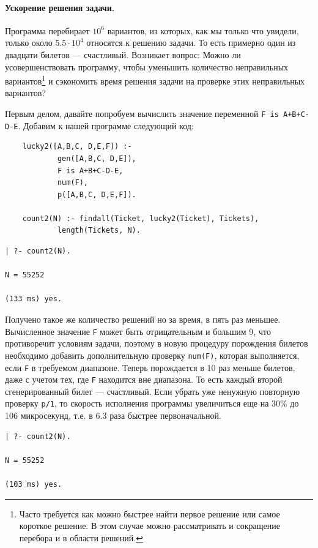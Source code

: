 \documentclass[12pt, openany, oneside]{book} %
\begin{document}
\paragraph{Ускорение решения задачи.} Программа перебирает $10^6$ вариантов, из которых, как мы только что увидели, только около $5.5\cdot 10^4$ относятся к решению задачи. То есть примерно один из двадцати билетов --- счастливый. Возникает вопрос: Можно ли усовершенствовать программу, чтобы уменьшить количество неправильных вариантов\footnote{Часто требуется как можно быстрее найти первое решение или самое короткое решение. В этом случае можно рассматривать и сокращение перебора и в области решений.} и сэкономить время решения задачи на проверке этих неправильных вариантов?

Первым делом, давайте попробуем вычислить значение переменной \texttt{F is A+B+C-D-E}. Добавим к нашей программе следующий код:
{\tt\begin{verbatim}
    lucky2([A,B,C, D,E,F]) :-
            gen([A,B,C, D,E]),
            F is A+B+C-D-E,
            num(F),
            p([A,B,C, D,E,F]).

    count2(N) :- findall(Ticket, lucky2(Ticket), Tickets),
            length(Tickets, N).
\end{verbatim}}
{\tt\begin{verbatim}
| ?- count2(N).

N = 55252

(133 ms) yes.
\end{verbatim}}

\noindent{}Получено такое же количество решений но за время, в пять раз меньшее. Вычисленное значение \texttt{F} может быть отрицательным и большим 9, что противоречит условиям задачи, поэтому в новую процедуру порождения билетов необходимо добавить дополнительную проверку \texttt{num(F)}, которая выполняется, если \texttt{F} в требуемом диапазоне. Теперь порождается в 10 раз меньше билетов, даже с учетом тех, где \texttt{F} находится вне диапазона. То есть каждый второй сгенерированный билет --- счастливый.  Если убрать уже ненужную повторную проверку \texttt{p/1}, то скорость исполнения программы увеличиться еще на 30\% до 106 микросекунд, т.е. в 6.3 раза быстрее первоначальной.
{\tt\begin{verbatim}
| ?- count2(N).

N = 55252

(103 ms) yes.
\end{verbatim}}
\end{document}
